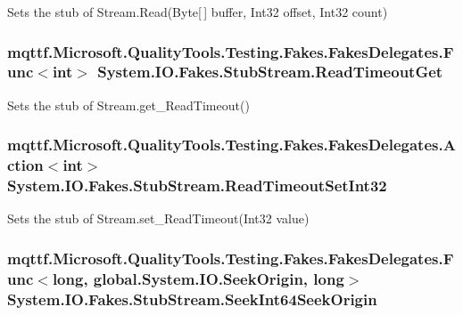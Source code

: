 Sets the stub of Stream.\-Read(\-Byte\mbox{[}$\,$\mbox{]} buffer, Int32 offset, Int32 count)

\hypertarget{class_system_1_1_i_o_1_1_fakes_1_1_stub_stream_ad45424578a2b787e8111e922e06af377}{
\subsubsection[{Read\-Timeout\-Get}]{\setlength{\rightskip}{0pt plus 5cm}mqttf.\-Microsoft.\-Quality\-Tools.\-Testing.\-Fakes.\-Fakes\-Delegates.\-Func$<$int$>$ System.\-I\-O.\-Fakes.\-Stub\-Stream.\-Read\-Timeout\-Get}}\label{class_system_1_1_i_o_1_1_fakes_1_1_stub_stream_ad45424578a2b787e8111e922e06af377}


Sets the stub of Stream.\-get\-\_\-\-Read\-Timeout()

\hypertarget{class_system_1_1_i_o_1_1_fakes_1_1_stub_stream_a66eda3159ace4dfaf6fdc4fdd12fbca7}{
\subsubsection[{Read\-Timeout\-Set\-Int32}]{\setlength{\rightskip}{0pt plus 5cm}mqttf.\-Microsoft.\-Quality\-Tools.\-Testing.\-Fakes.\-Fakes\-Delegates.\-Action$<$int$>$ System.\-I\-O.\-Fakes.\-Stub\-Stream.\-Read\-Timeout\-Set\-Int32}}\label{class_system_1_1_i_o_1_1_fakes_1_1_stub_stream_a66eda3159ace4dfaf6fdc4fdd12fbca7}


Sets the stub of Stream.\-set\-\_\-\-Read\-Timeout(\-Int32 value)

\hypertarget{class_system_1_1_i_o_1_1_fakes_1_1_stub_stream_adb37ef5875d4d463feaa872bf12d879f}{
\subsubsection[{Seek\-Int64\-Seek\-Origin}]{\setlength{\rightskip}{0pt plus 5cm}mqttf.\-Microsoft.\-Quality\-Tools.\-Testing.\-Fakes.\-Fakes\-Delegates.\-Func$<$long, global.\-System.\-I\-O.\-Seek\-Origin, long$>$ System.\-I\-O.\-Fakes.\-Stub\-Stream.\-Seek\-Int64\-Seek\-Origin}}\label{class_system_1_1_i_o_1_1_fakes_1_1_stub_stream_adb37ef5875d4d463feaa872bf12d879f}


